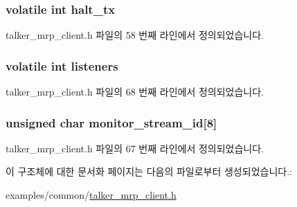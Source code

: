 \subsubsection[{\texorpdfstring{halt\+\_\+tx}{halt_tx}}]{\setlength{\rightskip}{0pt plus 5cm}volatile int halt\+\_\+tx}\hypertarget{structmrp__talker__ctx_a7c8176263e9704aa667fc335cc818a3f}{}\label{structmrp__talker__ctx_a7c8176263e9704aa667fc335cc818a3f}


talker\+\_\+mrp\+\_\+client.\+h 파일의 58 번째 라인에서 정의되었습니다.

\subsubsection[{\texorpdfstring{listeners}{listeners}}]{\setlength{\rightskip}{0pt plus 5cm}volatile int listeners}\hypertarget{structmrp__talker__ctx_a70763450542106f6508fd1051eade47d}{}\label{structmrp__talker__ctx_a70763450542106f6508fd1051eade47d}


talker\+\_\+mrp\+\_\+client.\+h 파일의 68 번째 라인에서 정의되었습니다.

\subsubsection[{\texorpdfstring{monitor\+\_\+stream\+\_\+id}{monitor_stream_id}}]{\setlength{\rightskip}{0pt plus 5cm}unsigned char monitor\+\_\+stream\+\_\+id\mbox{[}8\mbox{]}}\hypertarget{structmrp__talker__ctx_a0be105011a16541a479847730d7321c9}{}\label{structmrp__talker__ctx_a0be105011a16541a479847730d7321c9}


talker\+\_\+mrp\+\_\+client.\+h 파일의 67 번째 라인에서 정의되었습니다.



이 구조체에 대한 문서화 페이지는 다음의 파일로부터 생성되었습니다.\+:\begin{DoxyCompactItemize}
\item 
examples/common/\hyperlink{talker__mrp__client_8h}{talker\+\_\+mrp\+\_\+client.\+h}\end{DoxyCompactItemize}
